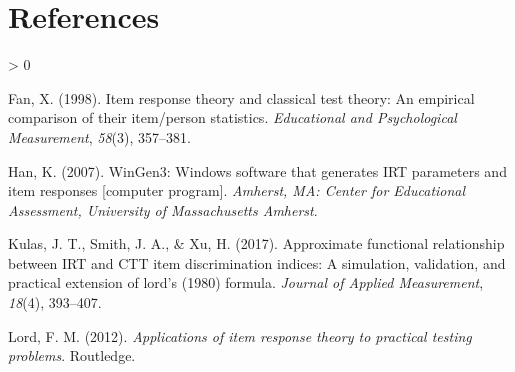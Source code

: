 \documentclass[
  english,
  man,floatsintext]{apa6}
\newlength{\cslhangindent}
\newenvironment{CSLReferences}[2] %
 {%
  \setlength{\parindent}{0pt}
  \ifodd #1 \everypar{\setlength{\hangindent}{\cslhangindent}}\ignorespaces\fi
  \ifnum #2 > 0
  \setlength{\parskip}{#2\baselineskip}
  \fi
 }%
 {}
\begin{document}
\newpage

\hypertarget{references}{%
\section{References}\label{references}}

\begingroup
\setlength{\parindent}{-0.5in}
\setlength{\leftskip}{0.5in}

\hypertarget{refs}{}
\begin{CSLReferences}{1}{0}
\leavevmode\hypertarget{ref-fan1998item}{}%
Fan, X. (1998). Item response theory and classical test theory: An empirical comparison of their item/person statistics. \emph{Educational and Psychological Measurement}, \emph{58}(3), 357--381.

\leavevmode\hypertarget{ref-han2007wingen3}{}%
Han, K. (2007). WinGen3: Windows software that generates IRT parameters and item responses {[}computer program{]}. \emph{Amherst, MA: Center for Educational Assessment, University of Massachusetts Amherst}.

\leavevmode\hypertarget{ref-kulas2017approximate}{}%
Kulas, J. T., Smith, J. A., \& Xu, H. (2017). Approximate functional relationship between IRT and CTT item discrimination indices: A simulation, validation, and practical extension of lord's (1980) formula. \emph{Journal of Applied Measurement}, \emph{18}(4), 393--407.

\leavevmode\hypertarget{ref-lord2012applications}{}%
Lord, F. M. (2012). \emph{Applications of item response theory to practical testing problems}. Routledge.

\end{CSLReferences}

\endgroup
\end{document}
